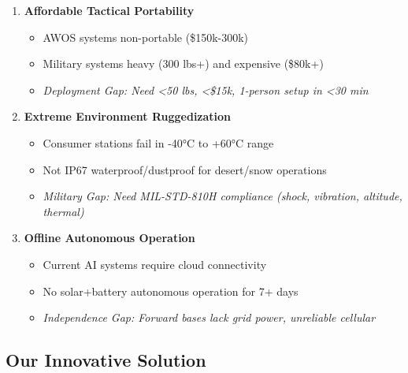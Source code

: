 \begin{enumerate}[leftmargin=*]
    \item \textcolor{missingcolor}{\textbf{Affordable Tactical Portability}}
    \begin{itemize}
        \item AWOS systems non-portable (\$150k-300k)
        \item Military systems heavy (300 lbs+) and expensive (\$80k+)
        \item \textit{Deployment Gap: Need <50 lbs, <\$15k, 1-person setup in <30 min}
    \end{itemize}
    
    \item \textcolor{missingcolor}{\textbf{Extreme Environment Ruggedization}}
    \begin{itemize}
        \item Consumer stations fail in -40°C to +60°C range
        \item Not IP67 waterproof/dustproof for desert/snow operations
        \item \textit{Military Gap: Need MIL-STD-810H compliance (shock, vibration, altitude, thermal)}
    \end{itemize}
    
    \item \textcolor{missingcolor}{\textbf{Offline Autonomous Operation}}
    \begin{itemize}
        \item Current AI systems require cloud connectivity
        \item No solar+battery autonomous operation for 7+ days
        \item \textit{Independence Gap: Forward bases lack grid power, unreliable cellular}
    \end{itemize}
\end{enumerate}

\subsection{Our Innovative Solution}

